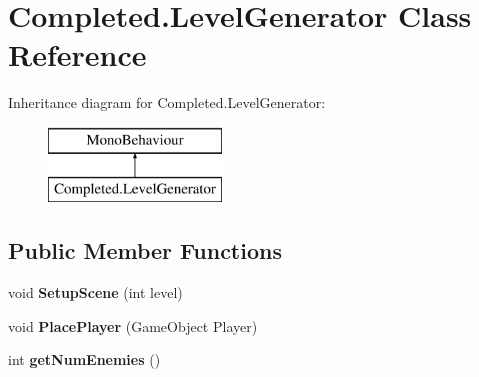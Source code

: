 \hypertarget{class_completed_1_1_level_generator}{}\section{Completed.\+Level\+Generator Class Reference}
\label{class_completed_1_1_level_generator}
Inheritance diagram for Completed.\+Level\+Generator\+:\begin{figure}[H]
\begin{center}
\leavevmode
\includegraphics[height=2.000000cm]{class_completed_1_1_level_generator}
\end{center}
\end{figure}
\subsection*{Public Member Functions}
\begin{DoxyCompactItemize}
\item 
\mbox{\label{class_completed_1_1_level_generator_aa6cf39de7260a0ac492e31dbc6c8273a}} 
void {\bfseries Setup\+Scene} (int level)
\item 
\mbox{\label{class_completed_1_1_level_generator_a1738146aa2a12138c19070b4bdbc2d22}} 
void {\bfseries Place\+Player} (Game\+Object Player)
\item 
\mbox{\label{class_completed_1_1_level_generator_a2ffea5be00328c47fa5460db2386b8e5}} 
int {\bfseries get\+Num\+Enemies} ()
\end{DoxyCompactItemize}
